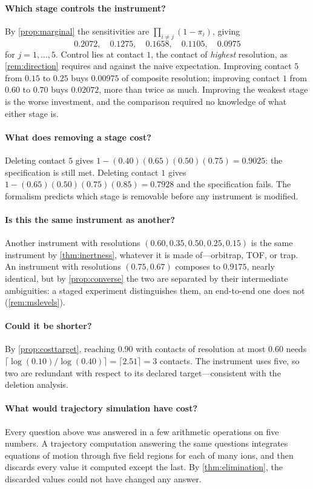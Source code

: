 \documentclass[11pt,a4paper]{article}
\theoremstyle{plain}
\theoremstyle{definition}
\theoremstyle{remark}
\newcommand{\pow}{\pi}
\begin{document}
\paragraph{Which stage controls the instrument?}
By \cref{prop:marginal} the sensitivities are $\prod_{i \ne j}(1-\pow_i)$,
giving
\[
0.2072,\quad 0.1275,\quad 0.1658,\quad 0.1105,\quad 0.0975
\]
for $j = 1,\dots,5$. Control lies at contact $1$, the contact of \emph{highest}
resolution, as \cref{rem:direction} requires and against the naive expectation.
Improving contact $5$ from $0.15$ to $0.25$ buys $0.00975$ of composite
resolution; improving contact $1$ from $0.60$ to $0.70$ buys $0.02072$, more
than twice as much. Improving the weakest stage is the worse investment, and the
comparison required no knowledge of what either stage is.

\paragraph{What does removing a stage cost?}
Deleting contact $5$ gives $1-(0.40)(0.65)(0.50)(0.75) = 0.9025$: the
specification is still met. Deleting contact $1$ gives
$1-(0.65)(0.50)(0.75)(0.85) = 0.7928$ and the specification fails. The formalism
predicts which stage is removable before any instrument is modified.

\paragraph{Is this the same instrument as another?}
Another instrument with resolutions $(0.60,0.35,0.50,0.25,0.15)$ is the same
instrument by \cref{thm:inertness}, whatever it is made of---orbitrap, TOF, or
trap. An instrument with resolutions $(0.75,0.67)$ composes to $0.9175$, nearly
identical, but by \cref{prop:converse} the two are separated by their
intermediate ambiguities: a staged experiment distinguishes them, an end-to-end
one does not (\cref{rem:mslevels}).

\paragraph{Could it be shorter?}
By \cref{prop:costtarget}, reaching $0.90$ with contacts of resolution at most
$0.60$ needs $\lceil \log(0.10)/\log(0.40)\rceil = \lceil 2.51 \rceil = 3$
contacts. The instrument uses five, so two are redundant with respect to its
declared target---consistent with the deletion analysis.

\paragraph{What would trajectory simulation have cost?}
Every question above was answered in a few arithmetic operations on five
numbers. A trajectory computation answering the same questions integrates
equations of motion through five field regions for each of many ions, and then
discards every value it computed except the last. By
\cref{thm:elimination}, the discarded values could not have changed any answer.
\end{document}

